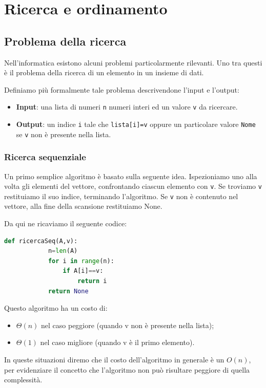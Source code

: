 \part{Ricerca e ordinamento}

\chapter{Problema della ricerca}
Nell'informatica esistono alcuni problemi particolarmente rilevanti. Uno tra questi è il problema della ricerca di un elemento in un insieme di
dati.

Definiamo più formalmente tale problema descrivendone l’input e l’output:
\begin{itemize}
    \item \textbf{Input}: una lista di numeri \verb|n| numeri interi ed un valore \verb|v| da ricercare.
    \item \textbf{Output}: un indice \verb|i| tale che \verb|lista[i]=v| oppure un particolare valore \verb|Nome| se \verb|v| non è presente nella lista.
\end{itemize}

\section{Ricerca sequenziale}

Un primo semplice algoritmo è basato sulla seguente idea. Ispezioniamo uno alla volta gli elementi del vettore, confrontando ciascun elemento con \verb|v|. Se troviamo \verb|v| restituiamo il suo indice, terminando l’algoritmo. Se \verb|v| non è contenuto nel vettore, alla fine della scansione
restituiamo None.

Da qui ne ricaviamo il seguente codice:
\begin{lstlisting}[language=Python]
        def ricercaSeq(A,v):
            n=len(A)
            for i in range(n):
                if A[i]==v:
                    return i
            return None
    \end{lstlisting}
    
Questo algoritmo ha un costo di:
\begin{itemize}
    \item $\Theta(n)$ nel caso peggiore (quando v non è presente nella lista);
    \item $\Theta(1)$ nel caso migliore (quando v è il primo elemento).
\end{itemize}

In queste situazioni diremo che il costo dell'algoritmo in generale è un $O(n)$, per evidenziare il concetto che l'algoritmo non può risultare peggiore di quella complessità.

